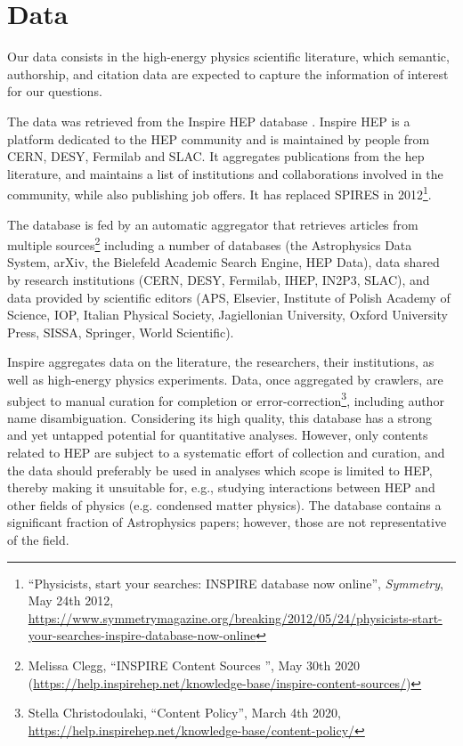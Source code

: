 \documentclass[smallextended]{svjour3}
\begin{document}
\section{Data\label{section:data}}


Our data consists in the high-energy physics scientific literature, which semantic, authorship, and citation data are expected to capture the information of interest for our questions.
 
The data was retrieved from the Inspire HEP database \citep{InspireAPI}. Inspire HEP is a platform dedicated to the HEP community and is maintained by people from CERN, DESY, Fermilab and SLAC. It aggregates publications from the \gls{hep} literature, and maintains a list of institutions and collaborations involved in the community, while also publishing job offers. It has replaced SPIRES in 2012\footnote{``Physicists, start your searches: INSPIRE database now online'', \textit{Symmetry}, May 24th 2012, \url{https://www.symmetrymagazine.org/breaking/2012/05/24/physicists-start-your-searches-inspire-database-now-online}
}.

The database is fed by an automatic aggregator that retrieves articles from multiple sources\footnote{Melissa Clegg, ``INSPIRE Content Sources
'', May 30th 2020 (\url{https://help.inspirehep.net/knowledge-base/inspire-content-sources/})} including a number of databases (the Astrophysics Data System, arXiv, the Bielefeld Academic Search Engine, HEP Data), data shared by research institutions (CERN, DESY, Fermilab, IHEP, IN2P3, SLAC), and data provided by scientific editors (APS, Elsevier, Institute of Polish Academy of Science, IOP, Italian Physical Society, Jagiellonian University, Oxford University Press, SISSA, Springer, World Scientific).

Inspire aggregates data on the literature, the researchers, their institutions, as well as high-energy physics experiments. Data, once aggregated by crawlers, are subject to manual curation for completion or error-correction\footnote{Stella Christodoulaki, ``Content Policy'', March 4th 2020, \url{https://help.inspirehep.net/knowledge-base/content-policy/}}, including author name disambiguation. Considering its high quality, this database has a strong and yet untapped potential for quantitative analyses. However, only contents related to HEP are subject to a systematic effort of collection and curation, and the data should preferably be used in analyses which scope is limited to HEP, thereby making it unsuitable for, e.g., studying interactions between HEP and other fields of physics (e.g. condensed matter physics). The database contains a significant fraction of Astrophysics papers; however, those are not representative of the field.
\end{document}
